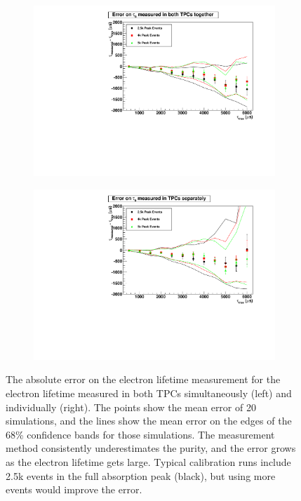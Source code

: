 \documentclass[herrin-thesis.tex]{subfiles}
\begin{document}
\begin{figure}[htb]
\begin{subfigure}[b]{0.5\linewidth}
\centering
\includegraphics[width=1.0\columnwidth]{./plots/el_sim_error_both.pdf}
\end{subfigure}%
\begin{subfigure}[b]{0.5\linewidth}
\centering
\includegraphics[width=1.0\columnwidth]{./plots/el_sim_error_indiv.pdf}
\end{subfigure}
\caption[Error on reconstructed electron lifetime from simulation]{The absolute error on the electron lifetime measurement for the electron lifetime measured in both TPCs simultaneously (left) and individually (right). The points show the mean error of 20 simulations, and the lines show the mean error on the edges of the 68\% confidence bands for those simulations. The measurement method consistently underestimates the purity, and the error grows as the electron lifetime gets large. Typical calibration runs include 2.5k events in the full absorption peak (black), but using more events would improve the error.}
\label{fig:el_sim_err}
\end{figure}
\end{document}
